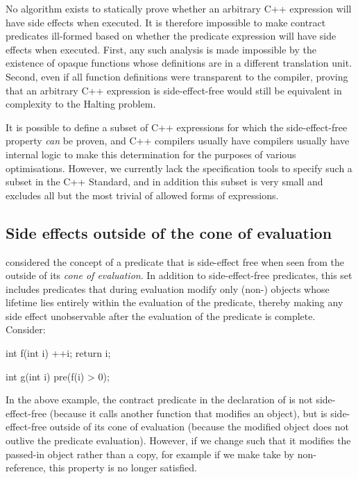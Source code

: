 No algorithm exists to statically prove whether an arbitrary C++ expression will have side effects when executed. It is therefore impossible to make contract predicates ill-formed based on whether the predicate expression will have side effects when executed. First, any such analysis is made impossible by the existence of opaque functions whose definitions are in a different translation unit. Second, even if all function definitions were transparent to the compiler, proving that an arbitrary C++ expression is side-effect-free would still be equivalent in complexity to the Halting problem.

It is possible to define a subset of C++ expressions for which the side-effect-free property \emph{can} be proven, and C++ compilers usually have compilers usually have internal logic to make this determination for the purposes of various optimisations. However, we currently lack the specification tools to specify such a subset in the C++ Standard, and in addition this subset is very small and excludes all but the most trivial of allowed forms of expressions.

\subsection{Side effects outside of the cone of evaluation}
\label{subsec:cone}

\cite{P2680R1} considered the concept of a predicate that is side-effect free when seen from the outside of its \emph{cone of evaluation}. In addition to side-effect-free predicates, this set includes predicates that during evaluation modify only (non-) objects whose lifetime lies entirely within the evaluation of the predicate, thereby making any side effect unobservable after the evaluation of the predicate is complete. Consider:

\pagebreak %
\begin{codeblock}
int f(int i) {
  ++i;
  return i;
}

int g(int i)
  pre(f(i) > 0);
\end{codeblock}

In the above example, the contract predicate in the declaration of  is not side-effect-free (because it calls another function  that modifies an object), but is side-effect-free outside of its cone of evaluation (because the modified object does not outlive the predicate evaluation). However, if we change  such that it modifies the passed-in object rather than a copy, for example if we make  take  by non- reference, this property is no longer satisfied.

